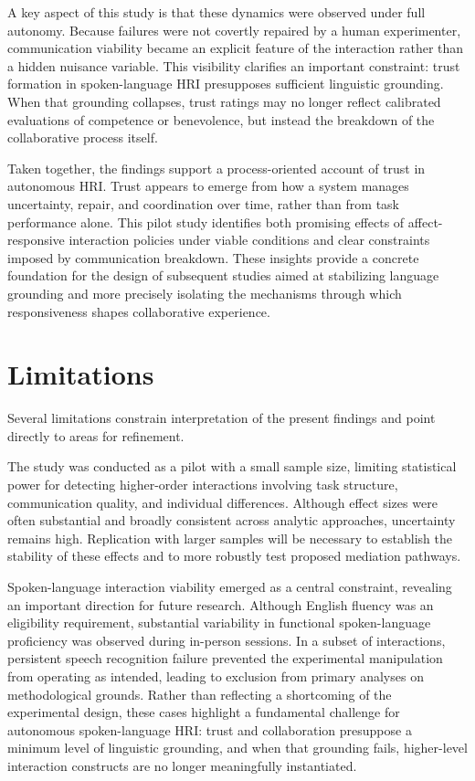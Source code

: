 \documentclass[
]{article}
\begin{document}
A key aspect of this study is that these dynamics were observed under
full autonomy. Because failures were not covertly repaired by a human
experimenter, communication viability became an explicit feature of the
interaction rather than a hidden nuisance variable. This visibility
clarifies an important constraint: trust formation in spoken-language
HRI presupposes sufficient linguistic grounding. When that grounding
collapses, trust ratings may no longer reflect calibrated evaluations of
competence or benevolence, but instead the breakdown of the
collaborative process itself.

Taken together, the findings support a process-oriented account of trust
in autonomous HRI. Trust appears to emerge from how a system manages
uncertainty, repair, and coordination over time, rather than from task
performance alone. This pilot study identifies both promising effects of
affect-responsive interaction policies under viable conditions and clear
constraints imposed by communication breakdown. These insights provide a
concrete foundation for the design of subsequent studies aimed at
stabilizing language grounding and more precisely isolating the
mechanisms through which responsiveness shapes collaborative experience.

\section{Limitations}\label{limitations}

Several limitations constrain interpretation of the present findings and
point directly to areas for refinement.

The study was conducted as a pilot with a small sample size, limiting
statistical power for detecting higher-order interactions involving task
structure, communication quality, and individual differences. Although
effect sizes were often substantial and broadly consistent across
analytic approaches, uncertainty remains high. Replication with larger
samples will be necessary to establish the stability of these effects
and to more robustly test proposed mediation pathways.

Spoken-language interaction viability emerged as a central constraint,
revealing an important direction for future research. Although English
fluency was an eligibility requirement, substantial variability in
functional spoken-language proficiency was observed during in-person
sessions. In a subset of interactions, persistent speech recognition
failure prevented the experimental manipulation from operating as
intended, leading to exclusion from primary analyses on methodological
grounds. Rather than reflecting a shortcoming of the experimental
design, these cases highlight a fundamental challenge for autonomous
spoken-language HRI: trust and collaboration presuppose a minimum level
of linguistic grounding, and when that grounding fails, higher-level
interaction constructs are no longer meaningfully instantiated.
\end{document}
